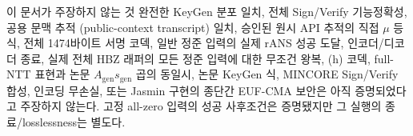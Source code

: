 \begin{takeaway}{이 문서가 주장하지 않는 것}
완전한 KeyGen 분포 일치, 전체 Sign/Verify 기능정확성, 공용 문맥 추적
(public-context transcript) 일치, 승인된 원시 API 추적의 직접 \(\mu\) 등식,
전체 1474바이트 서명 코덱, 일반 정준 입력의 실제 rANS 성공 도달,
인코더/디코더 종료,
실제 전체 HBZ 래퍼의 모든 정준 입력에 대한 무조건 왕복, (h) 코덱,
full-NTT 표현과 논문 \(A_{\mathrm{gen}}s_{\mathrm{gen}}\) 곱의 동일시,
논문 KeyGen 식, MINCORE Sign/Verify 합성, 인코딩 무손실, 또는 Jasmin 구현의
종단간 EUF-CMA 보안은 아직 증명되었다고 주장하지 않는다. 고정 all-zero
입력의 성공 사후조건은 증명됐지만 그 실행의 종료/losslessness는 별도다.
\end{takeaway}
